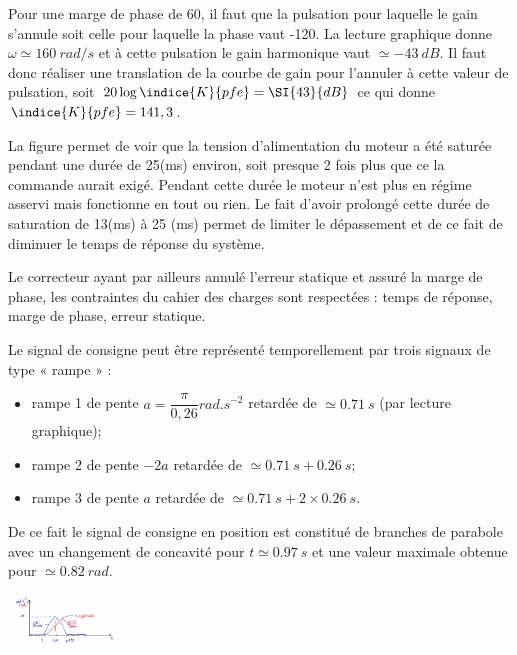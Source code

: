 \question{}
\ifprof
\begin{corrige}
Pour une marge de phase de 60\degres, il faut que la pulsation pour laquelle le gain s'annule soit celle 
pour laquelle la phase vaut -120\degres. La lecture graphique donne $\omega \simeq \SI{160}{rad/s}$
 et à cette 
pulsation le gain harmonique vaut $\simeq -\SI{43}{dB}$. Il faut donc réaliser une translation de la courbe 
de gain pour l'annuler à cette valeur de pulsation, soit $20\log \indice{K}{pfe}=\SI{43}{dB}$ ce qui donne
$\indice{K}{pfe}=141,3$.
\end{corrige}
\else
\fi


\question{}
\ifprof
\begin{corrige}
La figure permet de voir que la tension d'alimentation du moteur a été saturée pendant une durée 
de 25(ms) environ, soit presque 2 fois plus que ce la commande aurait exigé. Pendant cette durée le 
moteur n'est plus en régime asservi mais fonctionne en tout ou rien. Le fait d'avoir prolongé cette 
durée de saturation de 13(ms) à 25 (ms) permet de limiter le dépassement et de ce fait de diminuer 
le temps de réponse du système.
 
Le correcteur ayant par ailleurs annulé l'erreur statique et assuré la marge de phase, les contraintes 
du cahier des charges sont respectées : temps de réponse, marge de phase, erreur statique.

\end{corrige}
\else
\fi


\question{}
\ifprof
\begin{corrige}
Le signal de consigne peut être représenté temporellement par trois signaux de type « rampe » :
\begin{itemize}
\item rampe 1 de pente $a=\dfrac{\pi}{0,26} \si{rad.s^{-2}}$ retardée de $\simeq \SI{0,71}{s}$ (par lecture graphique);
\item rampe 2 de pente $-2a$ retardée de $\simeq \SI{0,71}{s}+\SI{0,26}{s}$;
\item rampe 3 de pente $a$ retardée de  $\simeq \SI{0,71}{s}+2\times \SI{0,26}{s}$.
\end{itemize}
De ce fait le signal de consigne en position est constitué de branches de parabole avec un changement de concavité pour $t\simeq \SI{0,97}{s}$ et une valeur maximale obtenue pour  $\simeq \SI{0,82}{rad}$.

\begin{center}
\includegraphics[width=3cm]{images/cor_22}
\end{center}

\end{corrige}
\else
\fi


